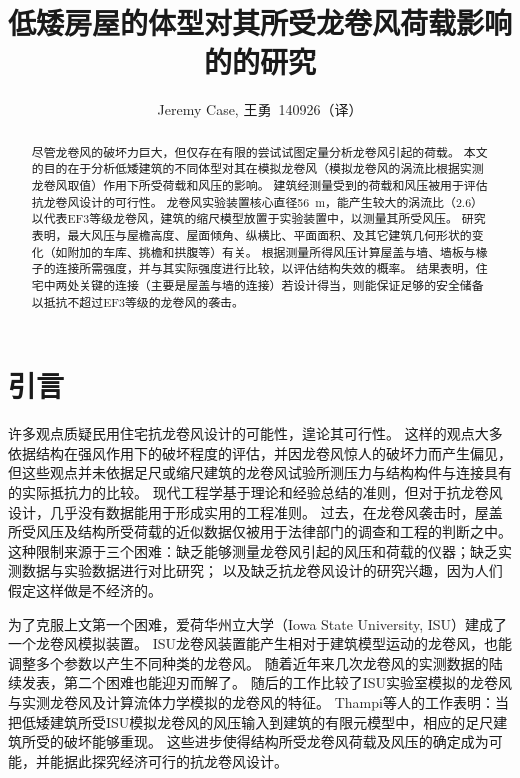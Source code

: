 \documentclass{ctexart}
\title{低矮房屋的体型对其所受龙卷风荷载影响的的研究}
\author{Jeremy Case, 王勇~140926（译）}
\date{}
\begin{document}
\maketitle

\begin{abstract}
尽管龙卷风的破坏力巨大，但仅存在有限的尝试试图定量分析龙卷风引起的荷载。
本文的目的在于分析低矮建筑的不同体型对其在模拟龙卷风（模拟龙卷风的涡流比根据实测龙卷风取值）作用下所受荷载和风压的影响。
建筑经测量受到的荷载和风压被用于评估抗龙卷风设计的可行性。
龙卷风实验装置核心直径\SI{56}{m}，能产生较大的涡流比（\num{2.6}）以代表EF3等级龙卷风，建筑的缩尺模型放置于实验装置中，以测量其所受风压。
研究表明，最大风压与屋檐高度、屋面倾角、纵横比、平面面积、及其它建筑几何形状的变化（如附加的车库、挑檐和拱腹等）有关。
根据测量所得风压计算屋盖与墙、墙板与椽子的连接所需强度，并与其实际强度进行比较，以评估结构失效的概率。
结果表明，住宅中两处关键的连接（主要是屋盖与墙的连接）若设计得当，则能保证足够的安全储备以抵抗不超过EF3等级的龙卷风的袭击。
\end{abstract}

\section{引言}
许多观点质疑民用住宅抗龙卷风设计的可能性，遑论其可行性。
这样的观点大多依据结构在强风作用下的破坏程度的评估，并因龙卷风惊人的破坏力而产生偏见，
但这些观点并未依据足尺或缩尺建筑的龙卷风试验所测压力与结构构件与连接具有的实际抵抗力的比较。
现代工程学基于理论和经验总结的准则，但对于抗龙卷风设计，几乎没有数据能用于形成实用的工程准则。
过去，在龙卷风袭击时，屋盖所受风压及结构所受荷载的近似数据仅被用于法律部门的调查和工程的判断之中。
这种限制来源于三个困难：缺乏能够测量龙卷风引起的风压和荷载的仪器；缺乏实测数据与实验数据进行对比研究；
以及缺乏抗龙卷风设计的研究兴趣，因为人们假定这样做是不经济的。

为了克服上文第一个困难\cite{haan2008design}，爱荷华州立大学（Iowa State University, ISU）建成了一个龙卷风模拟装置。
ISU龙卷风装置能产生相对于建筑模型运动的龙卷风，也能调整多个参数以产生不同种类的龙卷风。
随着近年来几次龙卷风的实测数据的陆续发表\cite{karstens2010near}\cite{lee2005diagnosed}\cite{wurman2002multiple}，第二个困难也能迎刃而解了。
随后的工作比较了ISU实验室模拟的龙卷风与实测龙卷风及计算流体力学模拟的龙卷风的特征\cite{sarkar2005laboratory}。
Thampi等人的工作\cite{thampi2011finite}表明：当把低矮建筑所受ISU模拟龙卷风的风压输入到建筑的有限元模型中，相应的足尺建筑所受的破坏能够重现。
这些进步使得结构所受龙卷风荷载及风压的确定成为可能，并能据此探究经济可行的抗龙卷风设计。
\end{document}
